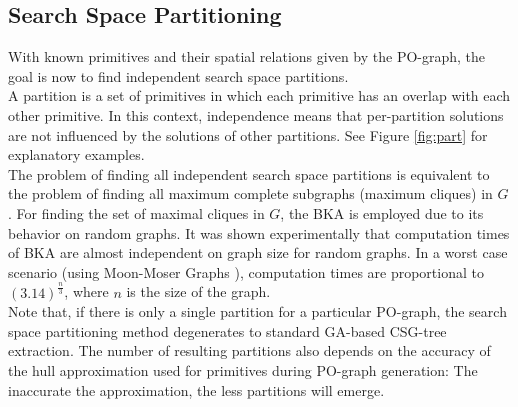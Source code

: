 \subsection{Search Space Partitioning}
With known primitives and their spatial relations given by the \ac{PO}-graph, the goal is now to find independent search space partitions. 
\\
A partition is a set of primitives in which each primitive has an overlap with each other primitive.
In this context, independence means that per-partition solutions are not influenced by the solutions of other partitions.
See Figure \ref{fig:part} for explanatory examples. 
\\
The problem of finding all independent search space partitions is equivalent to the problem of finding all maximum complete subgraphs (maximum cliques) in $G$.
For finding the set of maximal cliques in $G$, the \ac{BKA}\cite{bron1973cliques} is employed due to its behavior on random graphs.
It was shown experimentally \cite{bron1973cliques} that computation times of \ac{BKA} are almost independent on graph size for random graphs.
In a worst case scenario (using Moon-Moser Graphs \cite{moon1965cliques}), computation times are proportional to $(3.14)^{\frac{n}{3}}$, where $n$ is the size of the graph.
\\
Note that, if there is only a single partition for a particular \ac{PO}-graph, the search space partitioning method degenerates to standard \ac{GA}-based \ac{CSG}-tree extraction. 
The number of resulting partitions also depends on the accuracy of the hull approximation used for primitives during \ac{PO}-graph generation: 
The inaccurate the approximation, the less partitions will emerge.

